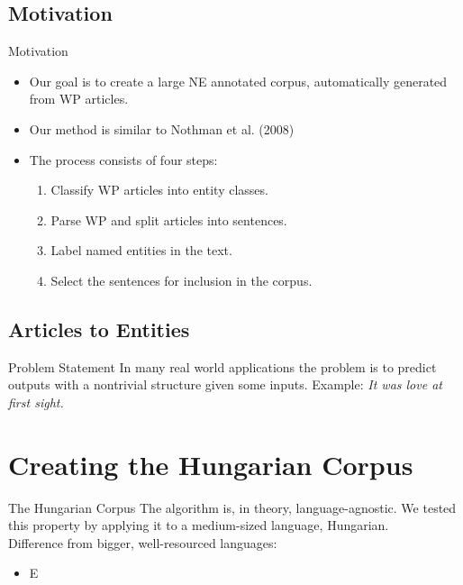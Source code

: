 \documentclass[utf8x]{beamer}
\newcommand{\vitem}{\vfill \item}
\begin{document}
\subsection*{Motivation}
\begin{frame}{Motivation}
  \begin{itemize}
  \vitem Our goal is to create a large NE annotated corpus, automatically
        generated from WP articles.
  \vitem Our method is similar to Nothman et al. (2008)
  \vitem The process consists of four steps:
    \begin{enumerate}
    \vitem Classify WP articles into entity classes.
    \vitem Parse WP and split articles into sentences.
    \vitem Label named entities in the text.
    \vitem Select the sentences for inclusion in the corpus.
    \end{enumerate}
  \end{itemize}
\end{frame}

\subsection{Articles to Entities}
\begin{frame}{Problem Statement}
  In many real world applications the problem is to predict outputs with a nontrivial structure given some inputs.
  \vfill
  Example: \textit{\small It was love at first sight.}
  \vfill
\end{frame}

\subsection{}
\subsection{}
\subsection{}

\section{Creating the Hungarian Corpus}

\begin{frame}{The Hungarian Corpus}
  The algorithm is, in theory, language-agnostic. We tested this property by
  applying it to a medium-sized language, Hungarian. \\
  Difference from bigger, well-resourced languages:
  \begin{itemize}
  \vitem E %
  \end{itemize}
\end{frame}
\end{document}
